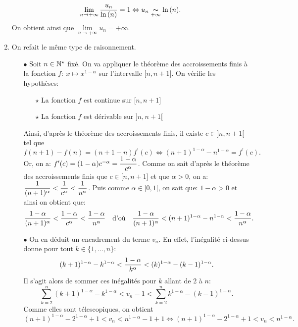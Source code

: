 \documentclass[a4paper, 11pt,reqno]{article}
\begin{document}
\begin{correction}
\begin{enumerate}
		      $$\lim\limits_{n\to +\infty} \displaystyle\frac{u_n}{\ln{(n)}}=1\Leftrightarrow u_n\underset{+\infty}{\thicksim} \ln{(n)}.$$
		      On obtient ainsi que $\lim\limits_{n\to +\infty} u_n=+\infty$.
		\item On refait le m\^eme type de raisonnement.
		      \begin{itemize}
			      \item[$\bullet$] Soit $n\in\mathbb{N}^{\star}$ fix\'e. On va appliquer le th\'eor\`eme des accroissements finis \`a la fonction
			            $f:\ x\mapsto x^{1-\alpha}$ sur l'intervalle $\lbrack n,n+1\rbrack$. On v\'erifie les hypoth\`eses:
			            \begin{itemize}
				            \item[$\star$] La fonction $f$ est continue sur $\lbrack n,n+1\rbrack$
				            \item[$\star$]  La fonction $f$ est d\'erivable sur $\rbrack n,n+1\lbrack$
			            \end{itemize}
			            Ainsi, d'apr\`es le th\'eor\`eme des accroissements finis, il existe $c\in\rbrack n,n+1\lbrack$ tel que
			            $$f(n+1)-f(n)=(n+1-n)f^{\prime}(c)\Leftrightarrow (n+1)^{1-\alpha}-n^{1-\alpha}=f^{\prime}(c).$$
			            Or, on a: $f^{\prime}(c)=(1-\alpha)c^{-\alpha}=\displaystyle\frac{1-\alpha}{c^{\alpha}}$. Comme on sait d'apr\`es le th\'eor\`eme des accroissements finis que $c\in\lbrack n,n+1\rbrack$ et que $\alpha >0$, on a: $\displaystyle\frac{1}{(n+1)^{\alpha}} < \displaystyle\frac{1}{c^{\alpha}} < \displaystyle\frac{1}{n^{\alpha}}$. Puis comme $ \alpha\in\rbrack 0,1\lbrack$, on sait que: $1-\alpha>0$ et ainsi on obtient que:
			            $$\displaystyle\frac{1-\alpha}{(n+1)^{\alpha}} < \displaystyle\frac{1-\alpha}{c^{\alpha}} <\displaystyle\frac{1-\alpha}{n^{\alpha}}\quad \hbox{d'o\`u}\quad
				            \displaystyle\frac{1-\alpha}{(n+1)^{\alpha}} < (n+1)^{1-\alpha}-n^{1-\alpha} <\displaystyle\frac{1-\alpha}{n^{\alpha}}      .$$
			      \item[$\bullet$]  On en d\'eduit un encadrement du terme $v_n$. En effet, l'in\'egalit\'e ci-dessus donne pour tout $k\in\lbrace 1,\dots, n\rbrace$:
			            $$(k+1)^{1-\alpha}-k^{1-\alpha} <\displaystyle\frac{1-\alpha}{k^{\alpha}} < (k)^{1-\alpha}-(k-1)^{1-\alpha}.$$
			            Il s'agit alors de sommer ces in\'egalit\'es pour $k$ allant de 2 \`a $n$:
			            $$\sum\limits_{k=2}^n (k+1)^{1-\alpha}-k^{1-\alpha} < v_n-1 < \sum\limits_{k=2}^n k^{1-\alpha}-(k-1)^{1-\alpha} .$$
			            Comme elles sont t\'elescopiques, on obtient
			            $$(n+1)^{1-\alpha}-2^{1-\alpha}+1<v_n<n^{1-\alpha}-1+1\Leftrightarrow (n+1)^{1-\alpha}-2^{1-\alpha}+1<v_n<n^{1-\alpha}.$$

\end{itemize}
\end{enumerate}
\end{correction}
\end{document}
